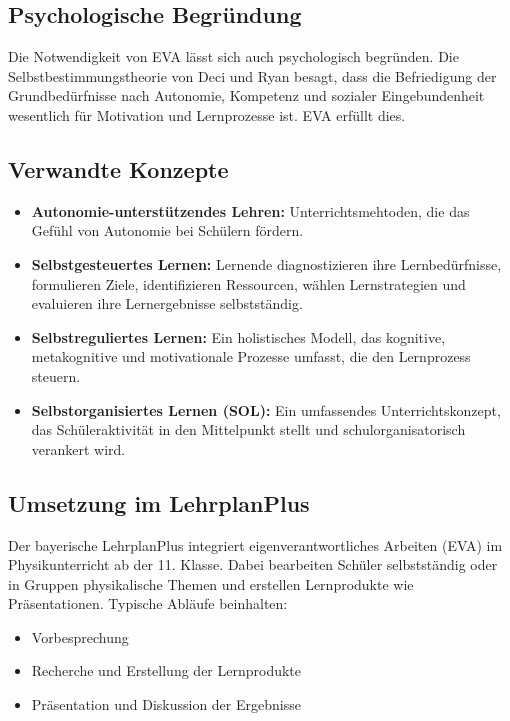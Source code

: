 \subsection{Psychologische Begr\"undung}
Die Notwendigkeit von EVA l\"asst sich auch psychologisch begr\"unden. Die Selbstbestimmungstheorie von Deci und Ryan besagt, dass die Befriedigung der Grundbed\"urfnisse nach Autonomie, Kompetenz und sozialer Eingebundenheit wesentlich f\"ur Motivation und Lernprozesse ist. EVA erf\"ullt dies.

\subsection{Verwandte Konzepte}
\begin{itemize}
	\item \textbf{Autonomie-unterst\"utzendes Lehren:} Unterrichtsmehtoden, die das Gef\"uhl von Autonomie bei Sch\"ulern f\"ordern.
	\item \textbf{Selbstgesteuertes Lernen:} Lernende diagnostizieren ihre Lernbed\"urfnisse, formulieren Ziele, identifizieren Ressourcen, w\"ahlen Lernstrategien und evaluieren ihre Lernergebnisse selbstst\"andig.
	\item \textbf{Selbstreguliertes Lernen:} Ein holistisches Modell, das kognitive, metakognitive und motivationale Prozesse umfasst, die den Lernprozess steuern.
	\item \textbf{Selbstorganisiertes Lernen (SOL):} Ein umfassendes Unterrichtskonzept, das Sch\"uleraktivit\"at in den Mittelpunkt stellt und schulorganisatorisch verankert wird.
\end{itemize}

\subsection{Umsetzung im LehrplanPlus}
Der bayerische LehrplanPlus integriert eigenverantwortliches Arbeiten (EVA) im Physikunterricht ab der 11. Klasse. Dabei bearbeiten Sch\"uler selbstst\"andig oder in Gruppen physikalische Themen und erstellen Lernprodukte wie Pr\"asentationen. Typische Abl\"aufe beinhalten:

\begin{itemize}
	\item Vorbesprechung
	\item Recherche und Erstellung der Lernprodukte
	\item Pr\"asentation und Diskussion der Ergebnisse
\end{itemize}

